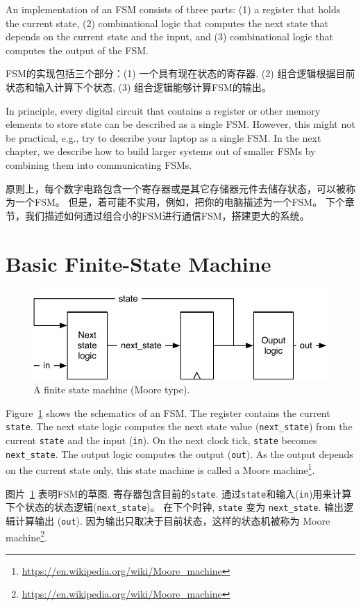 \documentclass[%
    10pt,
    headinclude, footexclude,
    openright, %
    notitlepage,
    cleardoubleempty,
    headsepline,
    pointlessnumbers,
    bibtotoc, idxtotoc,
    ]{scrbook}
\newcommand{\code}[1]{{\small{\texttt{#1}}}}
\newcommand{\scale}{0.7}
\newcommand{\myref}[2]{\href{#1}{#2}}
\renewcommand{\myref}[2]{{#2}{\footnote{\url{#1}}}}
\begin{document}
An implementation of an FSM consists of three parts: (1) a register that holds the current state,
(2) combinational logic that computes the next state that depends on the current
state and the input, and (3) combinational logic that computes the output of the FSM.

FSM的实现包括三个部分：(1) 一个具有现在状态的寄存器,
(2) 组合逻辑根据目前状态和输入计算下个状态,  
(3) 组合逻辑能够计算FSM的输出。

In principle, every digital circuit that contains a register or other memory elements
to store state can be described as a single FSM. However, this might
not be practical, e.g., try to describe your laptop as a single FSM.
In the next chapter, we describe how to build larger systems
out of smaller FSMs by combining them into communicating FSMs.

原则上，每个数字电路包含一个寄存器或是其它存储器元件去储存状态，可以被称为一个FSM。
但是，着可能不实用，例如，把你的电脑描述为一个FSM。
下个章节，我们描述如何通过组合小的FSM进行通信FSM，搭建更大的系统。

\section{Basic Finite-State Machine}

\begin{figure}
  \centering
  \includegraphics[scale=\scale]{figures/fsm}
  \caption{A finite state machine (Moore type).}
  \label{fig:fsm}
\end{figure}

Figure~\ref{fig:fsm} shows the schematics of an FSM. The register contains the current \code{state}.
The next state logic computes the next state value (\code{next\_state})
from the current \code{state} and the input (\code{in}).
On the next clock tick, \code{state} becomes \code{next\_state}.
The output logic computes the output (\code{out}). As the output depends on the current
state only, this state machine is called a
\myref{https://en.wikipedia.org/wiki/Moore_machine}{Moore machine}.

图片~\ref{fig:fsm} 表明FSM的草图. 寄存器包含目前的\code{state}.
通过\code{state}和输入(\code{in})用来计算下个状态的状态逻辑(\code{next\_state})。
在下个时钟, \code{state} 变为 \code{next\_state}.
输出逻辑计算输出 (\code{out}). 因为输出只取决于目前状态，这样的状态机被称为
\myref{https://en.wikipedia.org/wiki/Moore_machine}{Moore machine}.
\end{document}
